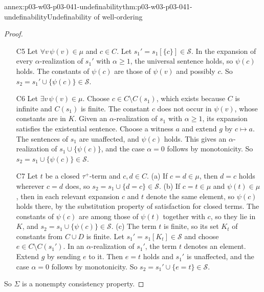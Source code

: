 \begin{annexitem}{annex:p03-w03-p03-041-undefinability}{thm:p03-w03-p03-041-undefinability}{Undefinability of well-ordering}
\begin{proof}
\begin{enumerate}
      \(1\leq\alpha<\omega_1\), pick \(\alpha'\geq\alpha\) with
      \(\psi_{\alpha'}=\psi\). By monotonicity \(\mathcal R_{\alpha'}\) is
      an \(\alpha\)-realization of \(s_1\) whose expansion satisfies
      \(\psi\). It is therefore an \(\alpha\)-realization of
      \(s_1\cup\{\psi\}\), because the constants of \(\psi\) are among
      those of the disjunction. The case \(\alpha=0\) follows by
      monotonicity. So \(s_2=s_1\cup\{\psi\}\in\mathcal S\) with
      \(\psi\in X\).
\item[C5] Let \(\forall v\,\psi(v)\in\mu\) and \(c\in C\). Let
      \(s_1'=s_1[\{c\}]\in\mathcal S\). In the expansion of every
      \(\alpha\)-realization of \(s_1'\) with \(\alpha\geq1\), the
      universal sentence holds, so \(\psi(c)\) holds. The constants of
      \(\psi(c)\) are those of \(\psi(v)\) and possibly \(c\). So
      \(s_2=s_1'\cup\{\psi(c)\}\in\mathcal S\).
\item[C6] Let \(\exists v\,\psi(v)\in\mu\). Choose
      \(c\in C\setminus C(s_1)\), which exists because \(C\) is infinite
      and \(C(s_1)\) is finite. The constant \(c\) does not occur in
      \(\psi(v)\), whose constants are in \(K\). Given an
      \(\alpha\)-realization of \(s_1\) with \(\alpha\geq1\), its expansion
      satisfies the existential sentence. Choose a witness \(a\) and extend
      \(g\) by \(c\mapsto a\). The sentences of \(s_1\) are unaffected, and
      \(\psi(c)\) holds. This gives an \(\alpha\)-realization of
      \(s_1\cup\{\psi(c)\}\), and the case \(\alpha=0\) follows by
      monotonicity. So \(s_2=s_1\cup\{\psi(c)\}\in\mathcal S\).
\item[C7] Let \(t\) be a closed \(\tau^{+}\)-term and \(c,d\in C\).
      (a) If \(c=d\in\mu\), then \(d=c\) holds wherever \(c=d\) does, so
      \(s_2=s_1\cup\{d=c\}\in\mathcal S\). (b) If \(c=t\in\mu\) and
      \(\psi(t)\in\mu\), then in each relevant expansion \(c\) and \(t\)
      denote the same element, so \(\psi(c)\) holds there, by the
      substitution property of satisfaction for closed terms. The
      constants of \(\psi(c)\) are among those of \(\psi(t)\) together
      with \(c\), so they lie in \(K\), and
      \(s_2=s_1\cup\{\psi(c)\}\in\mathcal S\). (c) The term \(t\) is
      finite, so its set \(K_t\) of constants from \(C\cup D\) is finite.
      Let \(s_1'=s_1[K_t]\in\mathcal S\) and choose
      \(e\in C\setminus C(s_1')\). In an \(\alpha\)-realization of
      \(s_1'\), the term \(t\) denotes an element. Extend \(g\) by sending
      \(e\) to it. Then \(e=t\) holds and \(s_1'\) is unaffected, and the
      case \(\alpha=0\) follows by monotonicity. So
      \(s_2=s_1'\cup\{e=t\}\in\mathcal S\).
\end{enumerate}
So \(\Sigma\) is a nonempty consistency property.


\end{proof}
\end{annexitem}
